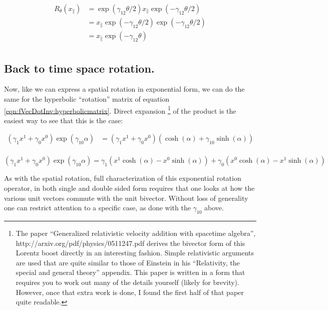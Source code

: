\begin{align*}
R_{\theta}(x_{\parallel}) 
&= \exp( \gamma_{12}\theta/2) x_{\parallel} \exp( -\gamma_{12}\theta/2) \\
&= x_{\parallel} \exp( -\gamma_{12}\theta/2) \exp( -\gamma_{12}\theta/2) \\
&= x_{\parallel} \exp( -\gamma_{12}\theta) \\
\end{align*}

\subsection{Back to time space rotation. }

Now, like we can express a spatial rotation in exponential form, we can do the same for the hyperbolic ``rotation'' matrix of equation \ref{eqn:fVecDotInv:hyperbolicmatrix}.  Direct expansion
\footnote{
The paper ``Generalized relativistic velocity addition with spacetime algebra'', http://arxiv.org/pdf/physics/0511247.pdf derives the bivector form of this Lorentz boost directly in an interesting fashion.  Simple relativistic arguments are used that are quite similar to those of Einstein in his ``Relativity, the special and general theory'' appendix.  This paper is written in a form that requires you to work out many of the details yourself (likely for brevity).  However, once that extra work is done, I found the first half of that paper quite readable.
}
of the product is the easiest way to see that this is the case:

\begin{align*}
\left(\gamma_{1} x^1 + \gamma_{0} x^0 \right)\exp(\gamma_{10}\alpha)
&= \left(\gamma_{1} x^1 + \gamma_{0} x^0 \right) \left( \cosh(\alpha) +\gamma_{10}\sinh(\alpha) \right) \\
\end{align*}

\begin{equation}\label{eqn:fVecDotInv:lorentz}
\left(\gamma_{1} x^1 + \gamma_{0} x^0 \right)\exp(\gamma_{10}\alpha)
= \gamma_1\left( x^1 \cosh(\alpha) - x^0 \sinh(\alpha)\right) 
 + \gamma_0\left( x^0 \cosh(\alpha) - x^1 \sinh(\alpha)\right)
\end{equation}

As with the spatial rotation, full characterization of this exponential rotation operator, in both single and double sided form requires that one looks at how the various unit vectors commute with the unit bivector.  Without loss of generality one can restrict attention to a specific case, as done with the $\gamma_{10}$ above.

